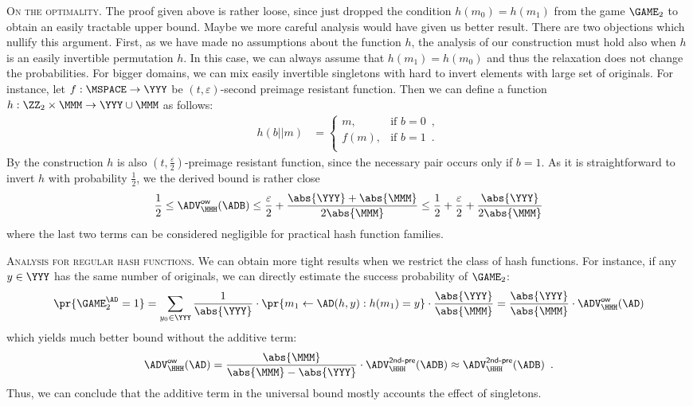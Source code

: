 \documentclass{crypto-exercise}
\newcommand{\ADVOW}[2]{\ADV^{\mathsf{ow}}_{#1}(#2)}
\newcommand{\ADVSPRE}[2]{\ADV^{\mathsf{2nd\text{-}pre}}_{#1}(#2)}
\begin{document}
\begin{solution}
\vspace*{2ex}
\noindent
\textsc{On the optimality.}
The proof given above is rather loose, since just dropped the condition $h(m_0)=h(m_1)$ from the game $\GAME_2$ to obtain an easily tractable upper bound. Maybe we more careful analysis would have given us better result. There are two objections which nullify this argument. First, as we have made no assumptions about the function $h$, the analysis of our construction must hold also when $h$ is an easily invertible permutation $h$. In this case,  we can always assume that $h(m_1)=h(m_0)$ and thus the relaxation does not change the probabilities. For bigger domains, we can mix easily invertible singletons with hard to invert elements with large set of originals. For instance, let $f:\MSPACE\to\YYY$ be $(t,\varepsilon)$-second preimage resistant function. Then we can define a function $h: \ZZ_2\times\MMM\to\YYY\cup\MMM$ as follows:
\begin{align*}
 h(b||m)&=
 \begin{cases}
  m, &\text{if } b=0\enspace,\\
  f(m), &\text{if } b=1\enspace.\\
\end{cases} 
\end{align*}
By the construction $h$ is also $(t, \frac{\varepsilon}{2})$-preimage resistant function, since the necessary pair occurs only if $b=1$. As it is straightforward to invert $h$ with probability $\frac{1}{2}$,  we the derived bound is rather close
\begin{align*}
\frac{1}{2}\leq \ADVOW{\HHH}{\ADB}\leq \frac{\varepsilon}{2}+\frac{\abs{\YYY}+\abs{\MMM}}{2\abs{\MMM}}\leq \frac{1}{2}+\frac{\varepsilon}{2}+\frac{\abs{\YYY}}{2\abs{\MMM}}
\end{align*}
where the last two terms can be considered negligible for practical hash function families.  

\vspace*{2ex}
\noindent
\textsc{Analysis for regular hash functions.}
We can obtain more tight results when we restrict the class of hash functions. For instance, if any $y\in\YYY$ has the same number of originals, we can directly estimate the success probability of $\GAME_2$: 
\begin{align*}
\pr{\GAME_2^\AD=1}=\sum_{y_0\in\YYY}\frac{1}{\abs{\YYY}}\cdot \pr{m_1\gets\AD(h,y): h(m_1)=y}\cdot \frac{\abs{\YYY}}{\abs{\MMM}}=\frac{\abs{\YYY}}{\abs{\MMM}}\cdot\ADVOW{\HHH}{\AD}
\end{align*}
which yields much better bound without the additive term:
\begin{align*}
\ADVOW{\HHH}{\AD}=\frac{\abs{\MMM}}{\abs{\MMM}-\abs{\YYY}}\cdot\ADVSPRE{\HHH}{\ADB}\approx \ADVSPRE{\HHH}{\ADB}\enspace.
\end{align*}
Thus, we can conclude that the additive term in the universal bound mostly accounts the effect of singletons.   


\end{solution}
\end{document}
